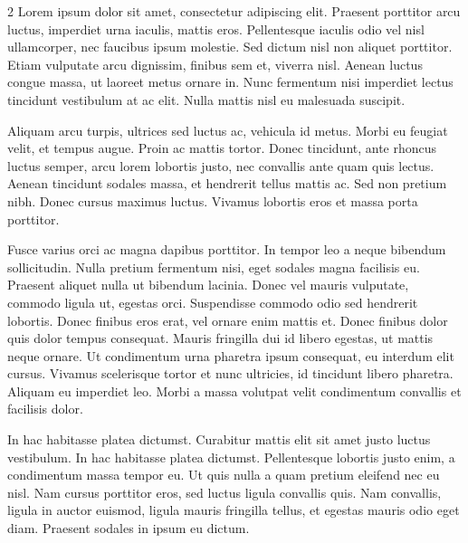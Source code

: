 \documentclass[
	a4paper, %
]{CSMakotoTechnicalReport}
\begin{document}
\begin{multicols}{2}
Lorem ipsum dolor sit amet, consectetur adipiscing elit. Praesent porttitor arcu luctus, imperdiet urna iaculis, mattis eros. Pellentesque iaculis odio vel nisl ullamcorper, nec faucibus ipsum molestie. Sed dictum nisl non aliquet porttitor. Etiam vulputate arcu dignissim, finibus sem et, viverra nisl. Aenean luctus congue massa, ut laoreet metus ornare in. Nunc fermentum nisi imperdiet lectus tincidunt vestibulum at ac elit. Nulla mattis nisl eu malesuada suscipit.

Aliquam arcu turpis, ultrices sed luctus ac, vehicula id metus. Morbi eu feugiat velit, et tempus augue. Proin ac mattis tortor. Donec tincidunt, ante rhoncus luctus semper, arcu lorem lobortis justo, nec convallis ante quam quis lectus. Aenean tincidunt sodales massa, et hendrerit tellus mattis ac. Sed non pretium nibh. Donec cursus maximus luctus. Vivamus lobortis eros et massa porta porttitor.

Fusce varius orci ac magna dapibus porttitor. In tempor leo a neque bibendum sollicitudin. Nulla pretium fermentum nisi, eget sodales magna facilisis eu. Praesent aliquet nulla ut bibendum lacinia. Donec vel mauris vulputate, commodo ligula ut, egestas orci. Suspendisse commodo odio sed hendrerit lobortis. Donec finibus eros erat, vel ornare enim mattis et. Donec finibus dolor quis dolor tempus consequat. Mauris fringilla dui id libero egestas, ut mattis neque ornare. Ut condimentum urna pharetra ipsum consequat, eu interdum elit cursus. Vivamus scelerisque tortor et nunc ultricies, id tincidunt libero pharetra. Aliquam eu imperdiet leo. Morbi a massa volutpat velit condimentum convallis et facilisis dolor.

In hac habitasse platea dictumst. Curabitur mattis elit sit amet justo luctus vestibulum. In hac habitasse platea dictumst. Pellentesque lobortis justo enim, a condimentum massa tempor eu. Ut quis nulla a quam pretium eleifend nec eu nisl. Nam cursus porttitor eros, sed luctus ligula convallis quis. Nam convallis, ligula in auctor euismod, ligula mauris fringilla tellus, et egestas mauris odio eget diam. Praesent sodales in ipsum eu dictum.


\end{multicols} %

\end{document}
